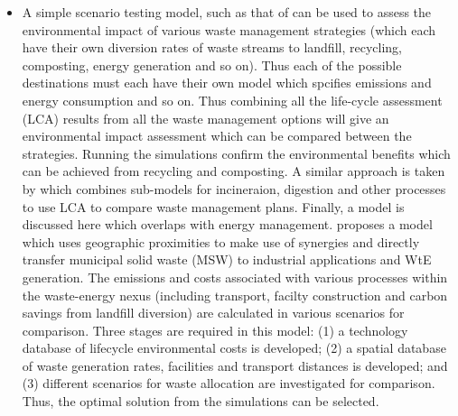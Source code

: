 \begin{itemize}
	\item A simple scenario testing model, such as that of \citet{Bovea2006} can be used to assess the environmental impact of various waste management strategies (which each have their own diversion rates of waste streams to landfill, recycling, composting, energy generation and so on). Thus each of the possible destinations must each have their own model which spcifies emissions and energy consumption and so on. Thus combining all the life-cycle assessment (LCA) results from all the waste management options will give an environmental impact assessment which can be compared between the strategies. Running the simulations confirm the environmental benefits which can be achieved from recycling and composting. A similar approach is taken by \citep{Eriksson2002} which combines sub-models for incineraion, digestion and other processes to use LCA to compare waste management plans. Finally, a model is discussed here which overlaps with energy management. \citet{Geng2010} proposes a model which uses geographic proximities to make use of synergies and directly transfer municipal solid waste (MSW) to industrial applications and WtE generation. The emissions and costs associated with various processes within the waste-energy nexus (including transport, facilty construction and carbon savings from landfill diversion) are calculated in various scenarios for comparison. Three stages are required in this model: (1) a technology database of lifecycle environmental costs is developed; (2) a spatial database of waste generation rates, facilities and transport distances is developed; and (3) different scenarios for waste allocation are investigated for comparison. Thus, the optimal solution from the simulations can be selected.

\end{itemize}
